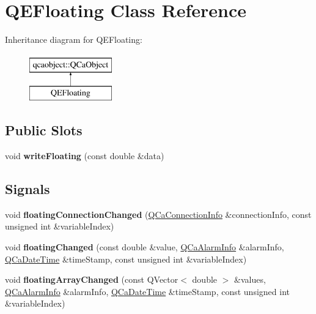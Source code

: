 \hypertarget{classQEFloating}{
\section{QEFloating Class Reference}
\label{classQEFloating}
}
Inheritance diagram for QEFloating:\begin{figure}[H]
\begin{center}
\leavevmode
\includegraphics[height=2.000000cm]{classQEFloating}
\end{center}
\end{figure}
\subsection*{Public Slots}
\begin{DoxyCompactItemize}
\item 
\hypertarget{classQEFloating_ac5057c7b6c6df20e07f92e4b83ecf8ae}{
void {\bfseries writeFloating} (const double \&data)}
\label{classQEFloating_ac5057c7b6c6df20e07f92e4b83ecf8ae}

\end{DoxyCompactItemize}
\subsection*{Signals}
\begin{DoxyCompactItemize}
\item 
\hypertarget{classQEFloating_a316e853af929d76ce83ed5f77ef3d0b9}{
void {\bfseries floatingConnectionChanged} (\hyperlink{classQCaConnectionInfo}{QCaConnectionInfo} \&connectionInfo, const unsigned int \&variableIndex)}
\label{classQEFloating_a316e853af929d76ce83ed5f77ef3d0b9}

\item 
\hypertarget{classQEFloating_a38efe862a3f74225aa436fa14fbedbff}{
void {\bfseries floatingChanged} (const double \&value, \hyperlink{classQCaAlarmInfo}{QCaAlarmInfo} \&alarmInfo, \hyperlink{classQCaDateTime}{QCaDateTime} \&timeStamp, const unsigned int \&variableIndex)}
\label{classQEFloating_a38efe862a3f74225aa436fa14fbedbff}

\item 
\hypertarget{classQEFloating_aa4eadc8229d7013ca725aa022ebaf80c}{
void {\bfseries floatingArrayChanged} (const QVector$<$ double $>$ \&values, \hyperlink{classQCaAlarmInfo}{QCaAlarmInfo} \&alarmInfo, \hyperlink{classQCaDateTime}{QCaDateTime} \&timeStamp, const unsigned int \&variableIndex)}
\label{classQEFloating_aa4eadc8229d7013ca725aa022ebaf80c}

\end{DoxyCompactItemize}
